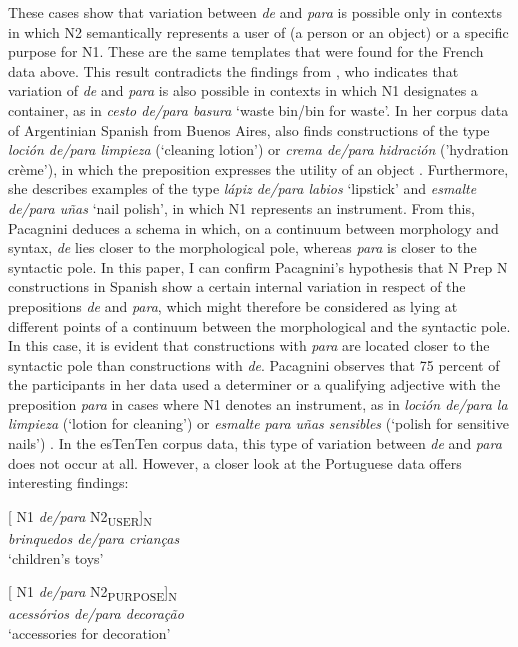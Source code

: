\documentclass[output=paper]{langsci/langscibook}
\begin{document}
These cases show that variation between \textit{de} and \textit{para} is possible only in contexts in which N2 semantically represents a user of (a person or an object) or a specific purpose for N1. These are the same templates that were found for the French data above. This result contradicts the findings from \citet{Lopez:1970}, who indicates that variation of \textit{de} and \textit{para} is also possible in contexts in which N1 designates a container, as in \textit{cesto de/para basura} `waste bin/bin for waste'. In her corpus data of Argentinian Spanish from Buenos Aires, \citet{Pacagnini:2003} also finds constructions of the type \textit{loción de/para limpieza} (`cleaning lotion') or \textit{crema de/para hidración} ('hydration crème'), in which the preposition expresses the utility of an object \citep[164]{Pacagnini:2003}. Furthermore, she describes examples of the type \textit{lápiz de/para labios} `lipstick' and \textit{esmalte de/para uñas} `nail polish', in which N1 represents an instrument. From this, Pacagnini deduces a schema in which, on a continuum between morphology and syntax, \textit{de} lies closer to the morphological pole, whereas \textit{para} is closer to the syntactic pole. In this paper, I can confirm Pacagnini’s hypothesis that N Prep N constructions in Spanish show a certain internal variation in respect of the prepositions \textit{de} and \textit{para}, which might therefore be considered as lying at different points of a continuum between the morphological and the syntactic pole. In this case, it is evident that constructions with \textit{para} are located closer to the syntactic pole than constructions with \textit{de}. Pacagnini observes that 75 percent of the participants in her data used a determiner or a qualifying adjective with the preposition \textit{para} in cases where N1 denotes an instrument, as in \textit{loción de/para la limpieza} (`lotion for cleaning') or \textit{esmalte para uñas sensibles} (`polish for sensitive nails') \citep[166]{Pacagnini:2003}. In the esTenTen corpus data, this type of variation between \textit{de} and \textit{para} does not occur at all. However, a closer look at the Portuguese data offers interesting findings: \\ 

\begin{minipage}{0.4\textwidth}    %
[ N1 \textit{de/para} N2\textsubscript{USER}]\textsubscript{N}\\
\textit{brinquedos de/para crianças}\\
`children’s toys'
\end{minipage}
\hfill            %
\begin{minipage}{0.4\textwidth}
[ N1 \textit{de/para} N2\textsubscript{PURPOSE}]\textsubscript{N}\\
\textit{acessórios de/para decoração}\\
`accessories for decoration'
\end{minipage} \\
\hfill  
\vspace{0.5cm}
\end{document}
